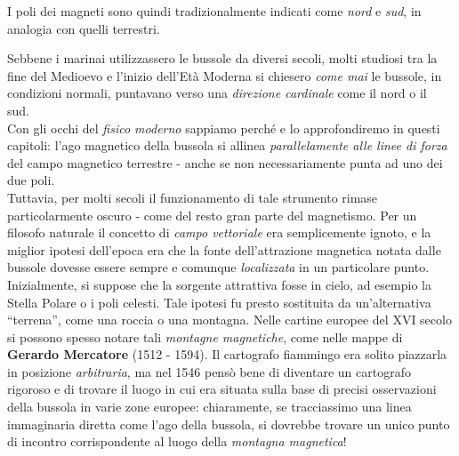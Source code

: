 I poli dei magneti sono quindi tradizionalmente indicati come \textit{nord} e \textit{sud}, in analogia con quelli terrestri.
\begin{digressionwt}
	Sebbene i marinai utilizzassero le bussole da diversi secoli, molti studiosi tra la fine del Medioevo e l'inizio dell'Età Moderna si chiesero \textit{come mai} le bussole, in condizioni normali, puntavano verso una \textit{direzione cardinale} come il nord o il sud.\newline~\\
	Con gli occhi del \textit{fisico moderno} sappiamo perché e lo approfondiremo in questi capitoli: l'ago magnetico della bussola si allinea \textit{parallelamente alle linee di forza} del campo magnetico terrestre - anche se non necessariamente punta ad uno dei due poli.\\
	Tuttavia, per molti secoli il funzionamento di tale strumento rimase particolarmente oscuro - come del resto gran parte del magnetismo. Per un filosofo naturale il concetto di \textit{campo vettoriale} era semplicemente ignoto, e la miglior ipotesi dell'epoca era che la fonte dell'attrazione magnetica notata dalle bussole dovesse essere sempre e comunque \textit{localizzata} in un particolare punto.\newline~\\
	Inizialmente, si suppose che la sorgente attrattiva fosse in cielo, ad esempio la Stella Polare o i poli celesti. Tale ipotesi fu presto sostituita da un'alternativa ``terrena'', come una roccia o una montagna. Nelle cartine europee del XVI secolo si possono spesso notare tali \textit{montagne magnetiche}, come nelle mappe di \textbf{Gerardo Mercatore} (1512 - 1594).
	Il cartografo fiammingo era solito piazzarla in posizione \textit{arbitraria}, ma nel 1546 pensò bene di diventare un cartografo rigoroso e di trovare il luogo in cui era situata sulla base di precisi osservazioni della bussola in varie zone europee: chiaramente, se tracciassimo una linea immaginaria diretta come l'ago della bussola, si dovrebbe trovare un unico punto di incontro corrispondente al luogo della \textit{montagna magnetica}!
	

\end{digressionwt}
